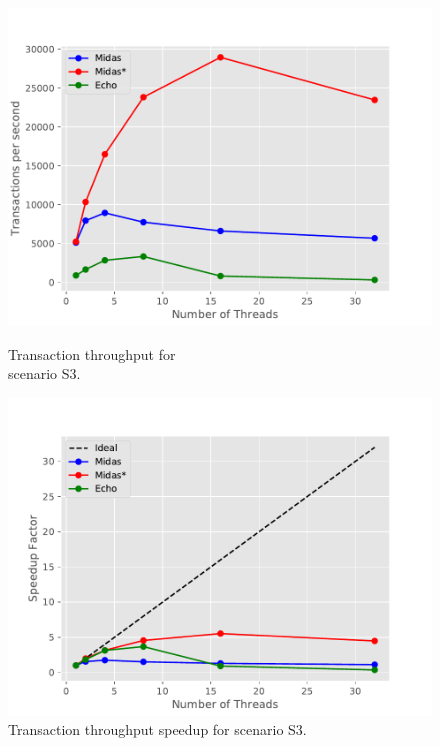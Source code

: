 \begin{figure}[h!]
\begin{minipage}[l]{0.50\textwidth}
    \includegraphics[width=\textwidth]{figures/bench/ttp-ls}
    \caption{Transaction throughput for\\scenario S3.}
    \label{fig:ttp-s3}
\end{minipage}
\begin{minipage}[l]{0.50\textwidth}
    \includegraphics[width=\textwidth]{figures/bench/spd-ls}
    \caption{Transaction throughput speedup for scenario S3.}
    \label{fig:spd-s3}
\end{minipage}
\begin{minipage}[l]{0.50\textwidth}

\end{minipage}
\end{figure}
